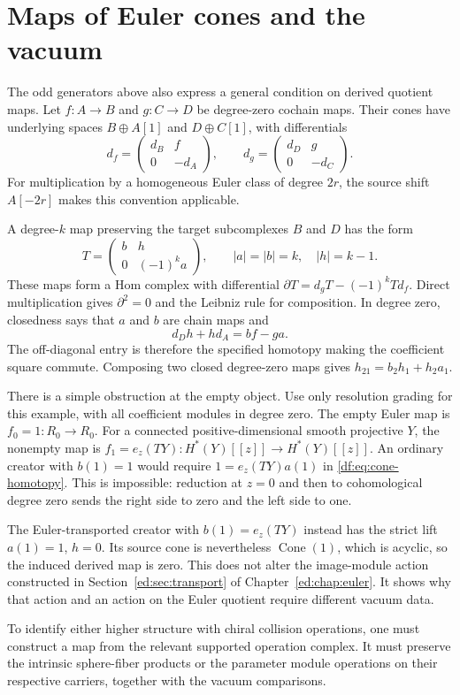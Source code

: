 \section{Maps of Euler cones and the vacuum}
\label{df:sec:cones}

The odd generators above also express a general condition on derived
quotient maps. Let $f:A\to B$ and $g:C\to D$ be degree-zero cochain
maps. Their cones have underlying spaces $B\oplus A[1]$ and
$D\oplus C[1]$, with differentials
\[
 d_f=\begin{pmatrix}d_B&f\\0&-d_A\end{pmatrix},\qquad
 d_g=\begin{pmatrix}d_D&g\\0&-d_C\end{pmatrix}.
\]
For multiplication by a homogeneous Euler class of degree $2r$,
the source shift $A[-2r]$ makes this convention applicable.

A degree-$k$ map preserving the target subcomplexes $B$ and $D$
has the form
\begin{equation}\label{df:eq:cone-map}
 T=\begin{pmatrix}b&h\\0&(-1)^k a\end{pmatrix},
 \qquad |a|=|b|=k,\quad |h|=k-1.
\end{equation}
These maps form a Hom complex with differential
$\partial T=d_gT-(-1)^kTd_f$. Direct multiplication gives
$\partial^2=0$ and the Leibniz rule for composition. In degree zero,
closedness says that $a$ and $b$ are chain maps and
\begin{equation}\label{df:eq:cone-homotopy}
 d_Dh+hd_A=bf-ga.
\end{equation}
The off-diagonal entry is therefore the specified homotopy making
the coefficient square commute. Composing two closed degree-zero maps
gives $h_{21}=b_2h_1+h_2a_1$.

There is a simple obstruction at the empty object. Use only resolution
grading for this example, with all coefficient modules in degree zero.
The empty Euler map is $f_0=1:R_0\to R_0$. For a connected
positive-dimensional smooth projective $Y$, the nonempty map is
$f_1=e_z(TY):H^*(Y)[[z]]\to H^*(Y)[[z]]$.
An ordinary creator with $b(1)=1$ would require
$1=e_z(TY)a(1)$ in \eqref{df:eq:cone-homotopy}.
This is impossible: reduction at $z=0$ and then to cohomological
degree zero sends the right side to zero and the left side to one.

The Euler-transported creator with $b(1)=e_z(TY)$ instead has the
strict lift $a(1)=1$, $h=0$. Its source cone is nevertheless
$\operatorname{Cone}(1)$, which is acyclic, so the induced derived
map is zero. This does not alter the image-module action constructed
in Section~\ref{ed:sec:transport} of Chapter~\ref{ed:chap:euler}.
It shows why that action and an
action on the Euler quotient require different vacuum data.

To identify either higher structure with chiral collision operations,
one must construct a map from the relevant supported operation complex.
It must preserve the intrinsic sphere-fiber products or the parameter
module operations on their respective carriers, together with the
vacuum comparisons.
